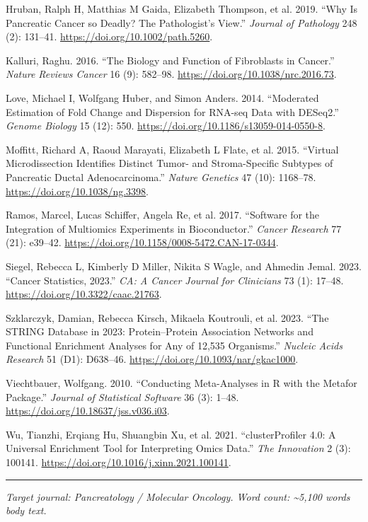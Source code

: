 \documentclass[
  12pt,
]{article}
\newlength{\cslhangindent}
\newenvironment{CSLReferences}[2] %
 {\begin{list}{}{%
  \setlength{\itemindent}{0pt}
  \setlength{\leftmargin}{0pt}
  \setlength{\parsep}{0pt}
  \ifodd #1
   \setlength{\leftmargin}{\cslhangindent}
   \setlength{\itemindent}{-1\cslhangindent}
  \fi
  \setlength{\itemsep}{#2\baselineskip}}}
 {\end{list}}
\begin{document}
\begin{CSLReferences}{1}{1}
Hruban, Ralph H, Matthias M Gaida, Elizabeth Thompson, et al. 2019.
{``Why Is Pancreatic Cancer so Deadly? {The} Pathologist's View.''}
\emph{Journal of Pathology} 248 (2): 131--41.
\url{https://doi.org/10.1002/path.5260}.

Kalluri, Raghu. 2016. {``The Biology and Function of Fibroblasts in
Cancer.''} \emph{Nature Reviews Cancer} 16 (9): 582--98.
\url{https://doi.org/10.1038/nrc.2016.73}.

Love, Michael I, Wolfgang Huber, and Simon Anders. 2014. {``Moderated
Estimation of Fold Change and Dispersion for {RNA-seq} Data with
{DESeq2}.''} \emph{Genome Biology} 15 (12): 550.
\url{https://doi.org/10.1186/s13059-014-0550-8}.

Moffitt, Richard A, Raoud Marayati, Elizabeth L Flate, et al. 2015.
{``Virtual Microdissection Identifies Distinct Tumor- and
Stroma-Specific Subtypes of Pancreatic Ductal Adenocarcinoma.''}
\emph{Nature Genetics} 47 (10): 1168--78.
\url{https://doi.org/10.1038/ng.3398}.

Ramos, Marcel, Lucas Schiffer, Angela Re, et al. 2017. {``Software for
the Integration of Multiomics Experiments in {Bioconductor}.''}
\emph{Cancer Research} 77 (21): e39--42.
\url{https://doi.org/10.1158/0008-5472.CAN-17-0344}.

Siegel, Rebecca L, Kimberly D Miller, Nikita S Wagle, and Ahmedin Jemal.
2023. {``Cancer Statistics, 2023.''} \emph{CA: A Cancer Journal for
Clinicians} 73 (1): 17--48. \url{https://doi.org/10.3322/caac.21763}.

Szklarczyk, Damian, Rebecca Kirsch, Mikaela Koutrouli, et al. 2023.
{``The {STRING} Database in 2023: Protein--Protein Association Networks
and Functional Enrichment Analyses for Any of 12,535 Organisms.''}
\emph{Nucleic Acids Research} 51 (D1): D638--46.
\url{https://doi.org/10.1093/nar/gkac1000}.

Viechtbauer, Wolfgang. 2010. {``Conducting Meta-Analyses in {R} with the
Metafor Package.''} \emph{Journal of Statistical Software} 36 (3):
1--48. \url{https://doi.org/10.18637/jss.v036.i03}.

Wu, Tianzhi, Erqiang Hu, Shuangbin Xu, et al. 2021. {``{clusterProfiler}
4.0: {A} Universal Enrichment Tool for Interpreting Omics Data.''}
\emph{The Innovation} 2 (3): 100141.
\url{https://doi.org/10.1016/j.xinn.2021.100141}.

\end{CSLReferences}

\begin{center}\rule{0.5\linewidth}{0.5pt}\end{center}

\emph{Target journal: Pancreatology / Molecular Oncology. Word count:
\textasciitilde5,100 words body text.}
\end{document}
